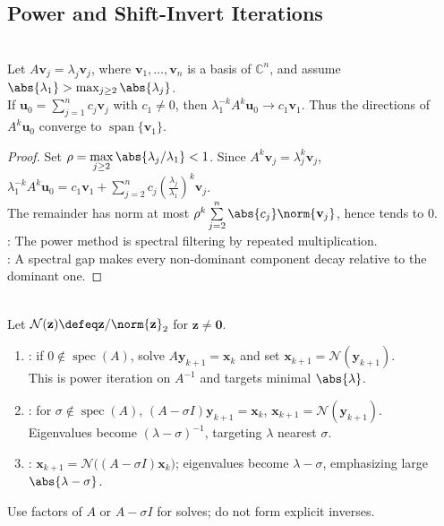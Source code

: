\subsection{Power and Shift-Invert Iterations}

\begin{theorem} \label{thm:power-method-dominant-eigenvector-preview} \\
Let $A\mathbf{v}_j=\lambda_j\mathbf{v}_j$, where $\mathbf{v}_1,\ldots,\mathbf{v}_n$ is a basis of $\mathbb{C}^n$, and assume $\abs{\lambda_1}>\max_{j\geq2}\abs{\lambda_j}$.\\
If $\mathbf{u}_0=\sum\limits_{j=1}^{n}c_j\mathbf{v}_j$ with $c_1\neq0$, then $\lambda_1^{-k}A^k\mathbf{u}_0\longrightarrow c_1\mathbf{v}_1$. Thus the directions of $A^k\mathbf{u}_0$ converge to $\operatorname{span}\{\mathbf{v}_1\}$.
\begin{proof}
Set $\rho=\max\limits_{j\geq2}\abs{\lambda_j/\lambda_1}<1$. Since $A^k\mathbf{v}_j=\lambda_j^k\mathbf{v}_j$, $\lambda_1^{-k}A^k\mathbf{u}_0 =c_1\mathbf{v}_1+\sum\limits_{j=2}^{n}c_j\left(\frac{\lambda_j}{\lambda_1}\right)^k\mathbf{v}_j$.\\
The remainder has norm at most $\rho^k\sum\limits_{j=2}^{n}\abs{c_j}\norm{\mathbf{v}_j}$, hence tends to $0$.\\
: The power method is spectral filtering by repeated multiplication.\\
: A spectral gap makes every non-dominant component decay relative to the dominant one.
\end{proof}
\end{theorem}

\begin{method} \label{meth:inverse-and-shifted-power-iteration-preview} \\
Let $\mathcal{N}(\mathbf{z})\defeq\mathbf{z}/\norm{\mathbf{z}}_2$ for $\mathbf{z}\neq\mathbf{0}$.
\begin{enumerate}[label=(\roman*)]
\setlength{\itemsep}{0pt}
\item {}: if $0\notin\operatorname{spec}(A)$, solve $A\mathbf{y}_{k+1}=\mathbf{x}_k$ and set $\mathbf{x}_{k+1}=\mathcal{N}(\mathbf{y}_{k+1})$.\\
This is power iteration on $A^{-1}$ and targets minimal $\abs{\lambda}$.
\item {}: for $\sigma\notin\operatorname{spec}(A)$, $(A-\sigma I)\mathbf{y}_{k+1}=\mathbf{x}_k$, $\mathbf{x}_{k+1}=\mathcal{N}(\mathbf{y}_{k+1})$.\\
Eigenvalues become $(\lambda-\sigma)^{-1}$, targeting $\lambda$ nearest $\sigma$.
\item {}: $\mathbf{x}_{k+1}=\mathcal{N}\bigl((A-\sigma I)\mathbf{x}_k\bigr)$; eigenvalues become $\lambda-\sigma$, emphasizing large $\abs{\lambda-\sigma}$.
\end{enumerate}
Use factors of $A$ or $A-\sigma I$ for solves; do not form explicit inverses.
\end{method}
